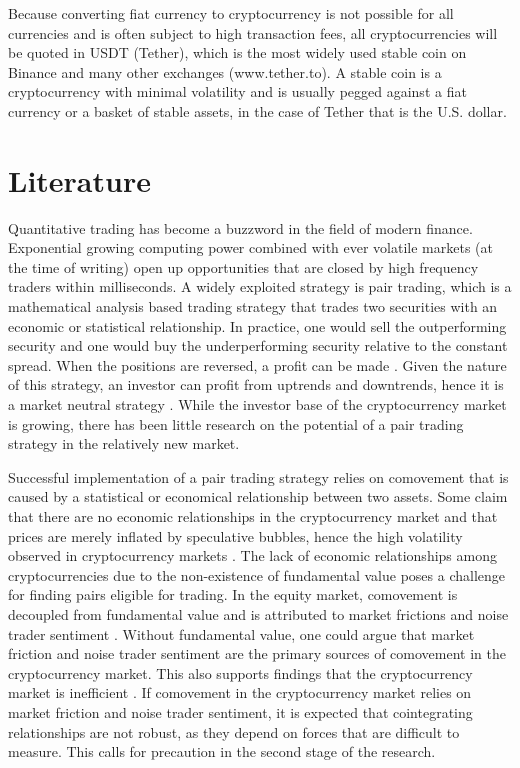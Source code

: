 \documentclass[12pt,english,authoryear]{article}
\begin{document}
Because converting fiat currency to cryptocurrency is not possible for all currencies and is often subject to high transaction fees, all cryptocurrencies will be quoted in USDT (Tether), which is the most widely used stable coin on Binance and many other exchanges (www.tether.to). A stable coin is a cryptocurrency with minimal volatility and is usually pegged against a fiat currency or a basket of stable assets, in the case of Tether that is the U.S. dollar.

\section{Literature} \label{sec:Literature}

Quantitative trading has become a buzzword in the field of modern finance. Exponential growing computing power combined with ever volatile markets (at the time of writing) open up opportunities that are closed by high frequency traders within milliseconds. A widely exploited strategy is pair trading, which is a mathematical analysis based trading strategy that trades two securities with an economic or statistical relationship. In practice, one would sell the outperforming security and one would buy the underperforming security relative to the constant spread. When the positions are reversed, a profit can be made \cite{Gatev2006, Vidamurthy_2004}. Given the nature of this strategy, an investor can profit from uptrends and downtrends, hence it is a market neutral strategy \cite{Elliot_2007}. While the investor base of the cryptocurrency market is growing, there has been little research on the potential of a pair trading strategy in the relatively new market.

Successful implementation of a pair trading strategy relies on comovement that is caused by a statistical or economical relationship between two assets. Some claim that there are no economic relationships in the cryptocurrency market and that prices are merely inflated by speculative bubbles, hence the high volatility observed in cryptocurrency markets \cite{Cheah_2015}. The lack of economic relationships among cryptocurrencies due to the non-existence of fundamental value poses a challenge for finding pairs eligible for trading. In the equity market, comovement is decoupled from fundamental value and is attributed to market frictions and noise trader sentiment \cite{Barbaris_2005}. Without fundamental value, one could argue that market friction and noise trader sentiment are the primary sources of comovement in the cryptocurrency market. This also supports findings that the cryptocurrency market is inefficient \cite{Urquhart_2016}. If comovement in the cryptocurrency market relies on market friction and noise trader sentiment, it is expected that cointegrating relationships are not robust, as they depend on forces that are difficult to measure. This calls for precaution in the second stage of the research. 
\end{document}
